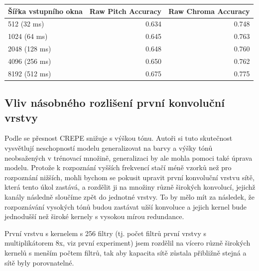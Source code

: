     \begin{tabular}{lrr}
    \toprule
    Šířka vstupního okna &  Raw Pitch Accuracy &  Raw Chroma Accuracy \\
    \midrule
    512 (32 ms)          &               0.634 &                0.748 \\
    1024 (64 ms)         &               0.645 &                0.763 \\
    2048 (128 ms)        &               0.648 &                0.760 \\
    4096 (256 ms)        &               0.650 &                0.762 \\
    8192 (512 ms)        &               0.675 &                0.775 \\
    \bottomrule
    \end{tabular}




\subsection{Vliv násobného rozlišení první konvoluční vrstvy}

Podle \cite{Kim2018} se přesnost CREPE snižuje s výškou tónu. Autoři si tuto skutečnost vysvětlují neschopností modelu generalizovat na barvy a výšky tónů neobsažených v trénovací množině, generalizaci by ale mohla pomoci také úprava modelu. Protože k rozpoznání vyšších frekvencí stačí méně vzorků než pro rozpoznání nižších, mohli bychom se pokusit upravit první konvoluční vrstvu sítě, která tento úkol zastává, a rozdělit ji na množiny různě širokých konvolucí, jejichž kanály následně sloučíme zpět do jednotné vrstvy. To by mělo mít za následek, že rozpoznávání vysokých tónů budou zastávat užší konvoluce a jejich kernel bude jednodušší než široké kernely s vysokou mírou redundance.

První vrstvu s kernelem s 256 filtry (tj. počet filtrů první vrstvy s multiplikátorem 8x, viz první experiment) jsem rozdělil na vícero různě širokých kernelů s menším počtem filtrů, tak aby kapacita sítě zůstala přibližně stejná a sítě byly porovnatelné. 


